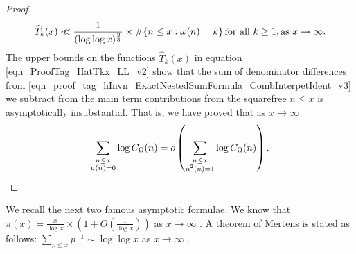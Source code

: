 \documentclass[11pt,reqno,a4letter]{article}
\numberwithin{equation}{section}
\numberwithin{figure}{section}
\numberwithin{table}{section}
\theoremstyle{plain}
\numberwithin{theorem}{section}
\theoremstyle{definition}
\theoremstyle{remark}
\newcommand{\mathtext}[1]{\text{\rm #1}}
\begin{document}
\begin{proof}
\begin{equation}
\label{eqn_ProofTag_HatTkx_LL_v2}
\widehat{T}_k(x) \ll \frac{1}{(\log\log x)^{\frac{2}{3}}} \times 
     \#\{n \leq x: \omega(n)=k\}\, 
     \mathtext{ for all } k \geq 1, \mathtext{ as } x \rightarrow \infty. 
\end{equation}
The upper bounds on the functions $\widehat{T}_k(x)$ in 
equation \eqref{eqn_ProofTag_HatTkx_LL_v2} 
show that the sum of denominator differences from 
\eqref{eqn_proof_tag_hInvn_ExactNestedSumFormula_CombInterpetIdent_v3} we subtract from the 
main term contributions from the squarefree $n \leq x$ is asymptotically insubstantial. 
That is, we have proved that as $x \rightarrow \infty$ 
\[
\sum_{\substack{n \leq x \\ \mu(n)=0}} \log C_{\Omega}(n) = 
     o\left(\sum_{\substack{n \leq x \\ \mu^2(n)=1}} \log C_{\Omega}(n)\right). 
     \qedhere
\]
\end{proof}

We recall the next two famous asymptotic formulae.
We know that 
$\pi(x) = \frac{x}{\log x} \times \left(1 + O\left(\frac{1}{\log x}\right)\right)$ 
as $x \rightarrow \infty$ \cite[\S 22.4]{HARDYWRIGHT}. 
A theorem of Mertens is stated as follows: 
$\sum_{p \leq x} p^{-1} \sim \log\log x$ as $x \rightarrow \infty$ 
\cite[\S 22.7--22.8]{HARDYWRIGHT}. 
\end{document}
